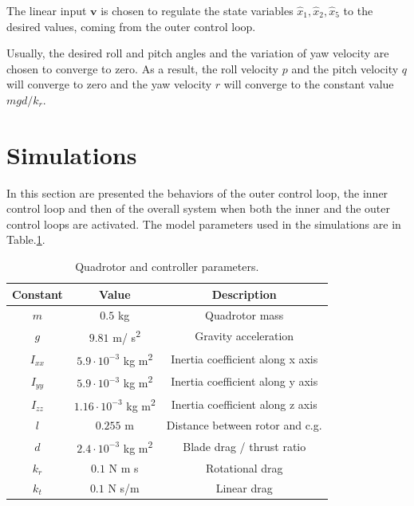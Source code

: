 \documentclass[11pt,a4paper]{scrartcl}
\begin{document}
The linear input $ \mathbf{v} $ is chosen to regulate the state variables $ \hat{x}_1, \hat{x}_2, \hat{x}_5 $ to the desired values, coming from the outer control loop.

Usually, the desired roll and pitch angles and the variation of yaw velocity are chosen to converge to zero. As a result, the roll velocity $ p $ and the pitch velocity $ q $ will converge to zero and the yaw velocity $ r $ will converge to the constant value $ mgd / k_r $. 

\section{Simulations}

In this section are presented the behaviors of the outer control loop, the inner control loop and then of the overall system when both the inner and the outer control loops are activated. The model parameters used in the simulations are in Table.\ref{Quadrotor and parameters}.

\begin{table}[H]
	\centering
	\begin{tabular}{c c c}
		\toprule
		Constant & Value & Description \\
		\midrule 
		$m$  & $0.5$ kg & Quadrotor mass \\
		$g$  & $9.81$ m/ s\textsuperscript{2}  & Gravity acceleration \\
		$I_{xx}$  & $5.9\cdot 10^{-3}$ kg m\textsuperscript{2} & Inertia coefficient along x axis \\
		$I_{yy}$  & $5.9\cdot 10^{-3}$ kg m\textsuperscript{2} & Inertia coefficient along y axis \\
		$I_{zz}$  & $1.16\cdot 10^{-3}$ kg m\textsuperscript{2} & Inertia coefficient along z axis \\
		$l$  & $0.255$ m & Distance between rotor and c.g. \\
		$d$  & $2.4\cdot 10^{-3}$ kg m\textsuperscript{2} & Blade drag / thrust ratio \\
		$k_r$  & $0.1$ N m s & Rotational drag \\
		$k_t$  & $0.1$ N s/m & Linear drag \\
		\bottomrule
	\end{tabular}
	\caption{Quadrotor and controller parameters.}
	\label{Quadrotor and parameters}
\end{table}
\end{document}
